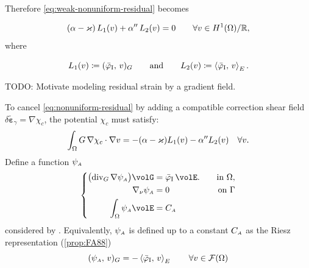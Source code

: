 Therefore \eqref{eq:weak-nonuniform-residual} becomes

\begin{equation}
(\alpha-\varkappa)\,L_1(v)+\alpha''\,L_2(v)=0 \qquad \forall v\in H^1(\Omega)/\mathbb{R},
\label{eq:nonuniform-residual}
\end{equation}
where


\begin{equation}
L_1(v) \coloneq (\WarpTwistIesan,\,v)_{G} %
\qquad\text{and}\qquad
L_2(v) \coloneq \left<\WarpTwistIesan,\,v\right>_{E}.
\label{eq:nonuniform-functionals}
\end{equation}

\begin{Note}
TODO: Motivate modeling residual strain by a gradient field.
\end{Note}
To cancel \eqref{eq:nonuniform-residual} by adding a compatible correction shear field
\(\delta\tilde{\bm{\varepsilon}}_{\gamma}=\nabla\chi_c\), the potential \(\chi_c\) must satisfy:
%
\begin{equation}
\int_{\Omega} G\,\nabla\chi_c\cdot\nabla v
= -(\alpha-\varkappa) L_1(v)-\alpha''L_2(v)\quad\forall v.
\label{eq:nonuniform-functional}
\end{equation}
%
Define a function \(\psi_{\scriptscriptstyle{A}}\)
\begin{equation}
\left\{
\begin{aligned}
\bigl( \DivG\nabla\WarpFA \bigr)\volG
  &=\WarpTwistIesan\,\volE.
&\quad\text{in }\Section, \\
\nabla_\nu \WarpFA &= 0 
&\quad \text{on } \SectionBoundary \\
\int_{\Section} \WarpFA \volE &= \AvgFA
\end{aligned}
\label{eq:warp-fa-bvp}
\right.
\end{equation}
considered by \cite{reissner1952nonuniform,armero2021modeling,genoese2013mixed}. 
Equivalently, \(\psi_{\scriptscriptstyle{A}}\) is defined up to a constant \(C_{\scriptscriptstyle{A}}\) as the Riesz representation  (\cref{prop:FA88})
\begin{equation}
(\psi_{\scriptscriptstyle{A}},\, v)_G = - \left<\bar{\varphi}_{\rm I},\, v\right>_E
\qquad \forall v \in \mathcal{F}(\Omega)
\label{eq:def-fa-riesz}
\end{equation}

